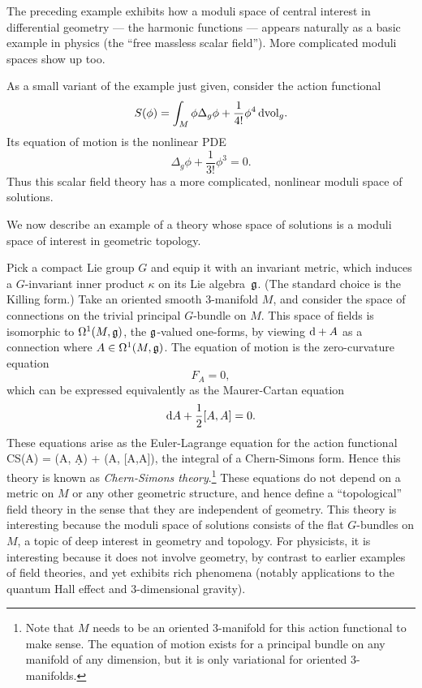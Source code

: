 \documentclass[11pt]{amsart}
\begin{document}
The preceding example exhibits how a moduli space of central interest in differential geometry --- the harmonic functions --- appears naturally as a basic example in physics (the ``free massless scalar field'').
More complicated moduli spaces show up too.

\begin{eg}
As a small variant of the example just given,
consider the action functional
\[
S(\phi) = \int_M \phi \Delta_g \phi + \frac{1}{4!} \phi^4\, {\rm d}{\rm vol}_g.
\]
Its equation of motion is the nonlinear PDE 
\[
\Delta_g \phi + \frac{1}{3!} \phi^3 = 0.
\] 
Thus this scalar field theory has a more complicated, nonlinear moduli space of solutions.
\end{eg}

We now describe an example of a theory whose space of solutions is a moduli space of interest in geometric topology.

\begin{eg}
Pick a compact Lie group $G$ and equip it with an invariant metric,
which induces a $G$-invariant inner product $\kappa$ on its Lie algebra~$\mathfrak g$.
(The standard choice is the Killing form.)
Take an oriented smooth 3-manifold $M$, 
and consider the space of connections on the trivial principal $G$-bundle on $M$.
This space of fields is isomorphic to $\Omega^1(M, \mathfrak g)$, the $\mathfrak g$-valued one-forms, 
by viewing ${\rm d} + A$ as a connection where $A \in \Omega^1(M, \mathfrak g)$.
The equation of motion is the zero-curvature equation
\[
F_A = 0,
\]
which can be expressed equivalently as the Maurer-Cartan equation
\[
{\rm d} A + \frac{1}{2} [A,A] = 0.
\]
These equations arise as the Euler-Lagrange equation for the action functional
\beqn
\label{eqn:CS}
CS(A) =  \kappa(A, \d A) +  \kappa(A, [A,A]),
\eeqn
the integral of a Chern-Simons form.
Hence this theory is known as {\em Chern-Simons theory}.\footnote{Note that $M$ needs to be an oriented 3-manifold for this action functional to make sense.
The equation of motion exists for a principal bundle on any manifold of any dimension,
but it is only variational for oriented 3-manifolds.}
These equations do not depend on a metric on $M$ or any other geometric structure,
and hence define a ``topological'' field theory in the sense that they are independent of geometry.
This theory is interesting because the moduli space of solutions consists of the flat $G$-bundles on $M$,
a topic of deep interest in geometry and topology.
For physicists, it is interesting because it does not involve geometry, 
by contrast to earlier examples of field theories,
and yet exhibits rich phenomena (notably applications to the quantum Hall effect and 3-dimensional gravity).
\end{eg}
\end{document}

